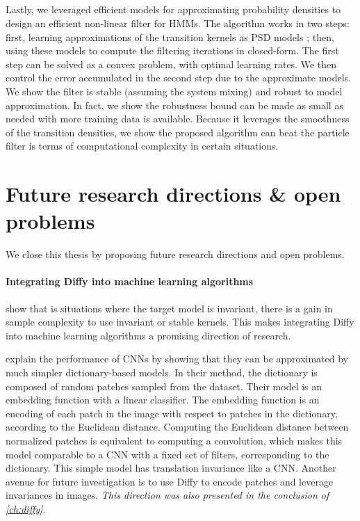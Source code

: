 \subparagraph{}
Lastly, we leveraged efficient models for approximating probability densities to design an efficient non-linear filter for HMMs. The algorithm works in two steps: first, learning approximations of the transition kernels as PSD models ; then, using these models to compute the filtering iterations in closed-form. The first step can be solved as a convex problem, with optimal learning rates. We then control the error accumulated in the second step due to the approximate models. We show the filter is stable (assuming the system mixing) and robust to model approximation. In fact, we show the robustness bound can be made as small as needed with more training data is available. Because it leverages the smoothness of the transition densities, we show the proposed algorithm can beat the particle filter is terms of computational complexity in certain situations.

\section*{Future research directions \& open problems}

We close this thesis by proposing future research directions and open problems.

\paragraph{Integrating Diffy into machine learning algorithms}
\cite{bietti} show that is situations where the target model is invariant, there is a gain in sample complexity to use invariant or stable kernels. This makes integrating Diffy into machine learning algorithms a promising direction of research.

\cite{thiry} explain the performance of CNNs by showing that they can be approximated by much simpler dictionary-based models. In their method, the dictionary is composed of random patches sampled from the dataset. Their model is an embedding function with a linear classifier. The embedding function is an encoding of each patch in the image with respect to patches in the dictionary, according to the Euclidean distance. Computing the Euclidean distance between normalized patches is equivalent to computing a convolution, which makes this model comparable to a CNN with a fixed set of filters, corresponding to the dictionary. This simple model has translation invariance like a CNN. Another avenue for future investigation is to use Diffy to encode patches and leverage invariances in images. \emph{This direction was also presented in the conclusion of \cref{ch:diffy}.}

